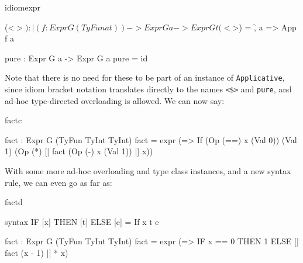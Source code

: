 \begin{SaveVerbatim}{idiomexpr}

(<$>) : |(f : Expr G (TyFun a t)) -> Expr G a -> Expr G t
(<$>) = \f, a => App f a

pure : Expr G a -> Expr G a
pure = id

\end{SaveVerbatim}

\noindent
Note that there is no need for these to be part of an instance of \texttt{Applicative},
since idiom bracket notation translates directly to the names \texttt{<\$>} and
\texttt{pure}, and ad-hoc type-directed overloading is allowed. We can now say:

\begin{SaveVerbatim}{factc}

fact : Expr G (TyFun TyInt TyInt)
fact = expr (\x => If (Op (==) x (Val 0))
                      (Val 1) (Op (*) [| fact (Op (-) x (Val 1)) |] x))

\end{SaveVerbatim}

\noindent
With some more ad-hoc overloading and type class instances, and a new
syntax rule, we can even go as far as:

\begin{SaveVerbatim}{factd}

syntax IF [x] THEN [t] ELSE [e] = If x t e

fact : Expr G (TyFun TyInt TyInt)
fact = expr (\x => IF x == 0 THEN 1 ELSE [| fact (x - 1) |] * x)

\end{SaveVerbatim}

